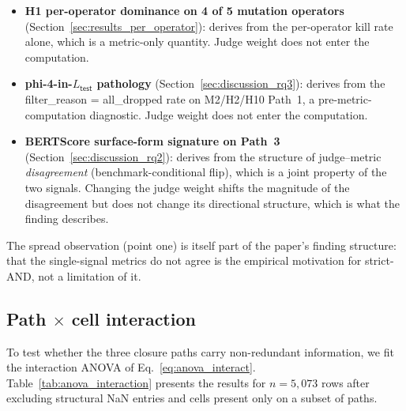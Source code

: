 \begin{itemize}
  \item \textbf{H1 per-operator dominance on 4 of 5 mutation operators} (Section~\ref{sec:results_per_operator}): derives from the per-operator kill rate alone, which is a metric-only quantity. Judge weight does not enter the computation.
  \item \textbf{phi-4-in-$L_{\textsf{test}}$ pathology} (Section~\ref{sec:discussion_rq3}): derives from the \textsf{filter\_reason} = \textsf{all\_dropped} rate on M2/H2/H10 Path~1, a pre-metric-computation diagnostic. Judge weight does not enter the computation.
  \item \textbf{BERTScore surface-form signature on Path~3} (Section~\ref{sec:discussion_rq2}): derives from the structure of judge--metric \emph{disagreement} (benchmark-conditional flip), which is a joint property of the two signals. Changing the judge weight shifts the magnitude of the disagreement but does not change its directional structure, which is what the finding describes.
\end{itemize}

The spread observation (point one) is itself part of the paper's finding structure: that the single-signal metrics do not agree is the empirical motivation for strict-AND, not a limitation of it.

\subsection{Path $\times$ cell interaction}
\label{sec:results_path_cell_interaction}



To test whether the three closure paths carry non-redundant information, we fit the interaction ANOVA of Eq.~\ref{eq:anova_interact}. Table~\ref{tab:anova_interaction} presents the results for $n = 5{,}073$ rows after excluding structural NaN entries and cells present only on a subset of paths.

